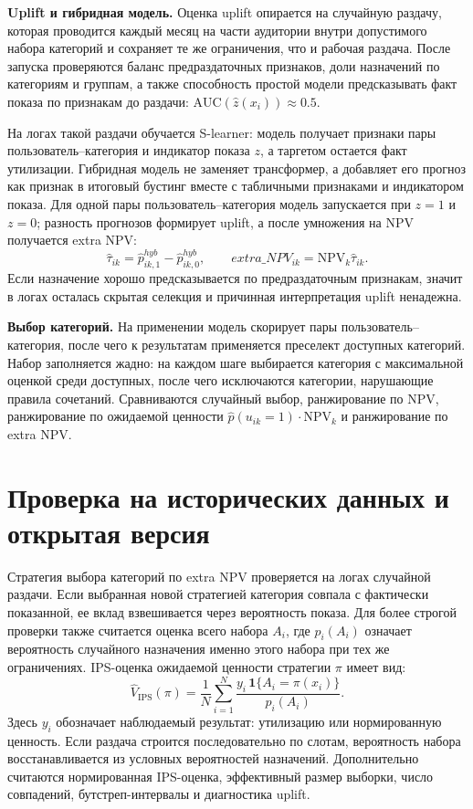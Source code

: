 \documentclass[11pt,a4paper]{article}
\newcommand{\NPV}{\mathrm{NPV}}
\newcommand{\I}{\mathbf{1}}
\newcommand{\AUC}{\mathrm{AUC}}
\begin{document}
\textbf{Uplift и гибридная модель.} Оценка uplift опирается на случайную раздачу, которая проводится каждый месяц на части аудитории внутри допустимого набора категорий и сохраняет те же ограничения, что и рабочая раздача. После запуска проверяются баланс предраздаточных признаков, доли назначений по категориям и группам, а также способность простой модели предсказывать факт показа по признакам до раздачи: $\AUC(\hat z(x_i))\approx 0.5$.

На логах такой раздачи обучается S-learner: модель получает признаки пары пользователь--категория и индикатор показа $z$, а таргетом остается факт утилизации. Гибридная модель не заменяет трансформер, а добавляет его прогноз как признак в итоговый бустинг вместе с табличными признаками и индикатором показа. Для одной пары пользователь--категория модель запускается при $z=1$ и $z=0$; разность прогнозов формирует uplift, а после умножения на NPV получается extra NPV:
\[
\hat\tau_{ik}=\hat p^{hyb}_{ik,1}-\hat p^{hyb}_{ik,0},
\qquad
extra\_NPV_{ik}=\NPV_k\hat\tau_{ik}.
\]
Если назначение хорошо предсказывается по предраздаточным признакам, значит в логах осталась скрытая селекция и причинная интерпретация uplift ненадежна.

\textbf{Выбор категорий.} На применении модель скорирует пары пользователь--категория, после чего к результатам применяется преселект доступных категорий. Набор заполняется жадно: на каждом шаге выбирается категория с максимальной оценкой среди доступных, после чего исключаются категории, нарушающие правила сочетаний. Сравниваются случайный выбор, ранжирование по $\NPV$, ранжирование по ожидаемой ценности $\hat p(u_{ik}=1)\cdot \NPV_k$ и ранжирование по extra NPV.

\section{Проверка на исторических данных и открытая версия}

Стратегия выбора категорий по extra NPV проверяется на логах случайной раздачи. Если выбранная новой стратегией категория совпала с фактически показанной, ее вклад взвешивается через вероятность показа. Для более строгой проверки также считается оценка всего набора $A_i$, где $p_i(A_i)$ означает вероятность случайного назначения именно этого набора при тех же ограничениях. IPS-оценка ожидаемой ценности стратегии $\pi$ имеет вид:
\[
\widehat V_{\mathrm{IPS}}(\pi)=
\frac{1}{N}\sum_{i=1}^{N}
\frac{y_i\,\I\{A_i=\pi(x_i)\}}{p_i(A_i)}.
\]
Здесь $y_i$ обозначает наблюдаемый результат: утилизацию или нормированную ценность. Если раздача строится последовательно по слотам, вероятность набора восстанавливается из условных вероятностей назначений. Дополнительно считаются нормированная IPS-оценка, эффективный размер выборки, число совпадений, бутстреп-интервалы и диагностика uplift.
\end{document}
